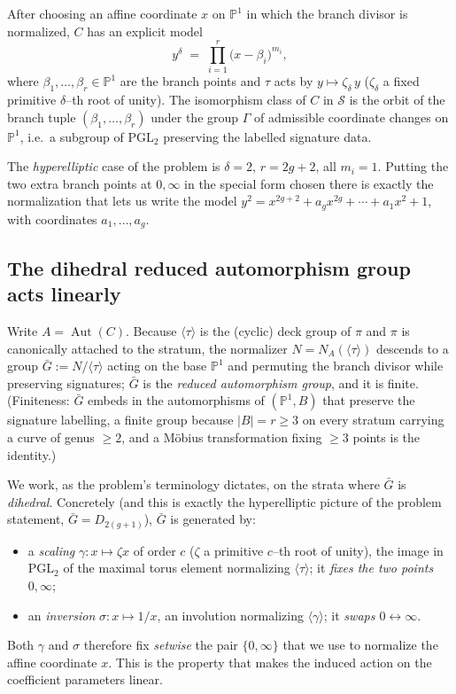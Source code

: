 \documentclass{amsart}
\theoremstyle{definition}
\DeclareMathOperator{\Aut}{Aut}
\begin{document}
After choosing an affine coordinate $x$ on $\mathbb{P}^1$ in which the branch
divisor is normalized, $C$ has an explicit model
\begin{equation}\label{eq:model}
 y^{\delta} \;=\; \prod_{i=1}^{r}\bigl(x-\beta_i\bigr)^{m_i},
\end{equation}
where $\beta_1,\dots,\beta_r\in\mathbb{P}^1$ are the branch points and $\tau$ acts
by $y\mapsto\zeta_\delta\, y$ ($\zeta_\delta$ a fixed primitive $\delta$--th root
of unity). The isomorphism class of $C$ in $\mathcal S$ is the orbit of the branch
tuple $(\beta_1,\dots,\beta_r)$ under the group $\Gamma$ of admissible coordinate
changes on $\mathbb{P}^1$, i.e.\ a subgroup of $\mathrm{PGL}_2$ preserving the
labelled signature data.

The \emph{hyperelliptic} case of the problem is $\delta=2$, $r=2g+2$, all $m_i=1$.
Putting the two extra branch points at $0,\infty$ in the special form chosen there
is exactly the normalization that lets us write the model
$y^2=x^{2g+2}+a_g x^{2g}+\cdots+a_1 x^2+1$, with coordinates $a_1,\dots,a_g$.

\subsection{The dihedral reduced automorphism group acts linearly}
Write $A=\Aut(C)$. Because $\langle\tau\rangle$ is the (cyclic) deck group of
$\pi$ and $\pi$ is canonically attached to the stratum, the normalizer
$N=N_A(\langle\tau\rangle)$ descends to a group
$\bar G:=N/\langle\tau\rangle$
acting on the base $\mathbb{P}^1$ and permuting the branch divisor while
preserving signatures; $\bar G$ is the \emph{reduced automorphism group}, and it
is finite. (Finiteness: $\bar G$ embeds in the automorphisms of
$(\mathbb{P}^1,B)$ that preserve the signature labelling, a finite group because
$|B|=r\ge 3$ on every stratum carrying a curve of genus $\ge 2$, and a M\"obius
transformation fixing $\ge 3$ points is the identity.)

We work, as the problem's terminology dictates, on the strata where $\bar G$ is
\emph{dihedral}. Concretely (and this is exactly the hyperelliptic picture of the
problem statement, $\bar G=D_{2(g+1)}$), $\bar G$ is generated by:
\begin{itemize}
\item a \emph{scaling} $\gamma:x\mapsto\zeta x$ of order $c$ ($\zeta$ a primitive
$c$--th root of unity), the image in $\mathrm{PGL}_2$ of the maximal torus
element normalizing $\langle\tau\rangle$; it \emph{fixes the two points
$0,\infty$};
\item an \emph{inversion} $\sigma:x\mapsto 1/x$, an involution normalizing
$\langle\gamma\rangle$; it \emph{swaps $0\leftrightarrow\infty$}.
\end{itemize}
Both $\gamma$ and $\sigma$ therefore fix \emph{setwise} the pair
$\{0,\infty\}$ that we use to normalize the affine coordinate $x$. This is the
property that makes the induced action on the coefficient parameters linear.
\end{document}
